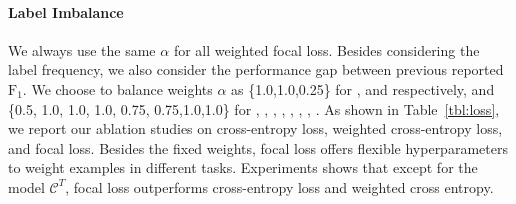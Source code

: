 
\paragraph{Label Imbalance}
\label{ssec:label_imb}
We always use the same $\alpha$ for all weighted focal loss. Besides
considering the label frequency, we also consider the performance
gap between previous reported $\text{F}_{1}$. We
choose to balance weights $\alpha$ as \{1.0,1.0,0.25\} for \CHANGE,\SUSTAIN
and \FN respectively, and \{0.5, 1.0, 1.0, 1.0, 0.75, 0.75,1.0,1.0\}
for \FA, \RES, \REC, \GI, \QUC, \QUO, \MIA, \MIN. As shown in
Table~\ref{tbl:loss}, we report our ablation studies on cross-entropy
loss, weighted cross-entropy loss, and focal loss. Besides the fixed
weights, focal loss offers flexible hyperparameters to weight
examples in different tasks. Experiments shows
that except for the model $\mathcal{C}^{T}$, focal loss outperforms
cross-entropy loss and weighted cross entropy.
